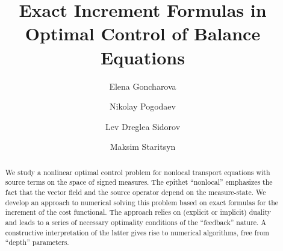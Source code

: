 \begin{englishtitle} %
\title{Exact Increment Formulas in Optimal Control of Balance Equations}
\author{ Elena Goncharova \and Nikolay Pogodaev \and Lev Dreglea Sidorov \and Maksim Staritsyn
}

\maketitle

\begin{abstract}
We study a nonlinear optimal control problem for nonlocal transport equations with source terms on the space of signed measures. The epithet ``nonlocal'' emphasizes the fact that the vector field and the source operator depend on the measure-state. We develop an approach to numerical solving  this problem based on exact formulas for the increment of the cost functional. The approach relies on (explicit or implicit) duality and leads to a series of necessary optimality conditions of the ``feedback'' nature. A constructive interpretation of the latter gives rise to numerical algorithms, free from ``depth'' parameters.

\end{abstract}
\end{englishtitle}

\iffalse
%
%


\documentclass[12pt]{llncs}  


\usepackage{iftex}



\ifPDFTeX
\usepackage[T2A]{fontenc}
\usepackage[utf8]{inputenc} %
\usepackage[english,russian]{babel}
\fi

\usepackage{todonotes} 

